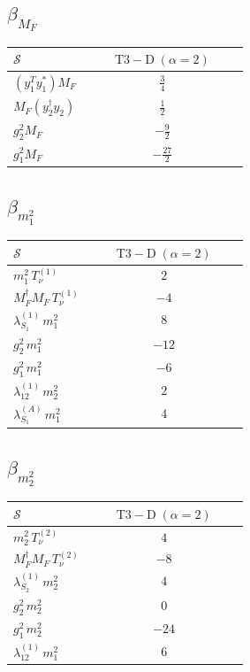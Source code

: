 \documentclass[9pt]{article}
\begin{document}
\subsection*{$ \beta_{M_F} $}
\begin{longtable}{@{}p{0.31\linewidth}c@{}}
\toprule
$\mathcal{S}$ & $ \mathrm{T3-D}\;(\alpha=2) $ \\
\midrule
$ (y_1^T y_1^*)M_F $ & $ \frac{3}{4} $ \\
$ M_F(y_2^\dagger y_2) $ & $ \frac{1}{2} $ \\
$ g_2^2M_F $ & $ - \frac{9}{2} $ \\
$ g_1^2M_F $ & $ - \frac{27}{2} $ \\
\bottomrule
\end{longtable}
\subsection*{$ \beta_{m_1^{2}} $}
\begin{longtable}{@{}p{0.31\linewidth}c@{}}
\toprule
$\mathcal{S}$ & $ \mathrm{T3-D}\;(\alpha=2) $ \\
\midrule
$ m_1^{2}\,T_{\nu}^{(1)} $ & $ 2 $ \\
$ M_F^\dagger M_F\,T_{\nu}^{(1)} $ & $ -4 $ \\
$ \lambda_{S_1}^{(1)}\,m_1^{2} $ & $ 8 $ \\
$ g_2^2\,m_1^{2} $ & $ -12 $ \\
$ g_1^2\,m_1^{2} $ & $ -6 $ \\
$ \lambda_{12}^{(1)}\,m_2^{2} $ & $ 2 $ \\
$ \lambda_{S_1}^{(A)}\,m_1^{2} $ & $ 4 $ \\
\bottomrule
\end{longtable}
\subsection*{$ \beta_{m_2^{2}} $}
\begin{longtable}{@{}p{0.31\linewidth}c@{}}
\toprule
$\mathcal{S}$ & $ \mathrm{T3-D}\;(\alpha=2) $ \\
\midrule
$ m_2^{2}\,T_{\nu}^{(2)} $ & $ 4 $ \\
$ M_F^\dagger M_F\,T_{\nu}^{(2)} $ & $ -8 $ \\
$ \lambda_{S_2}^{(1)}\,m_2^{2} $ & $ 4 $ \\
$ g_2^2\,m_2^{2} $ & $ 0 $ \\
$ g_1^2\,m_2^{2} $ & $ -24 $ \\
$ \lambda_{12}^{(1)}\,m_1^{2} $ & $ 6 $ \\
\bottomrule
\end{longtable}
\end{document}
